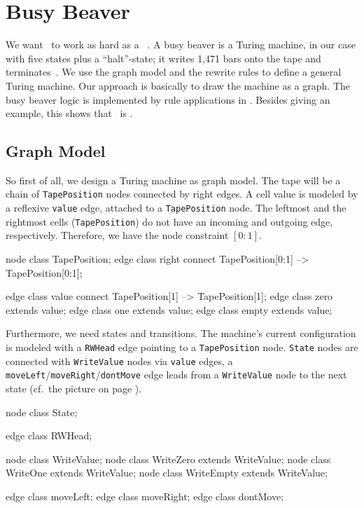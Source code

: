 \section{Busy Beaver}
We want \GrG\ to work as hard as a ~\cite{Kro:07,Dew:84}.
A busy beaver is a Turing machine, in our case with five states plus a ``halt''-state; it writes 1,471 bars onto the tape and terminates~\cite{MB:00}. 
We use the graph model and the rewrite rules to define a general Turing machine.
Our approach is basically to draw the machine as a graph.
The busy beaver logic is implemented by rule applications in \GrShell.
Besides giving an example, this shows that \GrG\ is .

\subsection{Graph Model}
So first of all, we design a Turing machine as graph model. 
The tape will be a chain of \texttt{TapePosition} nodes connected by right edges. 
A cell value is modeled by a reflexive \texttt{value} edge, attached to a \texttt{TapePosition} node.
The leftmost and the rightmost cells (\texttt{TapePosition}) do not have an incoming and outgoing edge, respectively.
Therefore, we have the node constraint $[0:1]$.

\begin{grgen}[firstnumber=last]
node class TapePosition;
edge class right
  connect TapePosition[0:1] --> TapePosition[0:1];

edge class value
  connect TapePosition[1] --> TapePosition[1];
edge class zero  extends value;
edge class one   extends value;
edge class empty extends value;
\end{grgen}

Furthermore, we need states and transitions.
The machine's current configuration is modeled with a \texttt{RWHead} edge pointing to a \texttt{TapePosition} node.
\texttt{State} nodes are connected with \texttt{WriteValue} nodes via \texttt{value} edges, a \texttt{moveLeft}/\texttt{moveRight}/\texttt{dontMove} edge leads from a \texttt{WriteValue} node to the next state (cf.~the picture on page \pageref{fig:bbstart}).

\begin{grgen}[firstnumber=last]
node class State;

edge class RWHead;

node class WriteValue;
node class WriteZero extends WriteValue;
node class WriteOne extends WriteValue;
node class WriteEmpty extends WriteValue;

edge class moveLeft;
edge class moveRight;
edge class dontMove;
\end{grgen}

